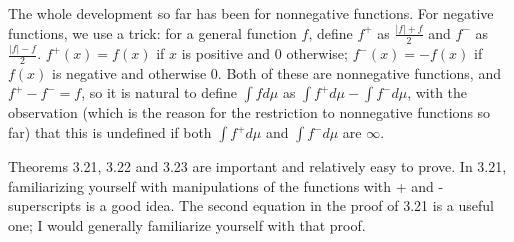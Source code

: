 \documentclass[12pt]{article}
\begin{document}
The whole development so far has been for nonnegative functions.  For negative functions, we use a trick:  for a general function $f$, define $f^+$ as $\frac{|f|+f}2$ and $f^-$ as $\frac{|f|-f}2$.  $f^+(x) = f(x)$ if $x$ is positive and 0 otherwise;  $f^{-}(x) = -f(x)$ if $f(x)$ is negative and otherwise 0.  Both of these are nonnegative functions, and $f^+-f^-=f$, so it is natural to define $\int f d\mu$ as
$\int f^+ d\mu -\int f^- d\mu$, with the observation (which is the reason for the restriction to nonnegative functions so far) that this is undefined if both $\int f^+d\mu$ and $\int f^- d\mu$ are $\infty$.

Theorems 3.21, 3.22 and 3.23 are important and relatively easy to prove.  In 3.21, familiarizing yourself with manipulations of the functions with + and - superscripts is a good idea.  The second equation in the proof of 3.21 is a useful one;  I would generally familiarize yourself with that proof.
\end{document}
